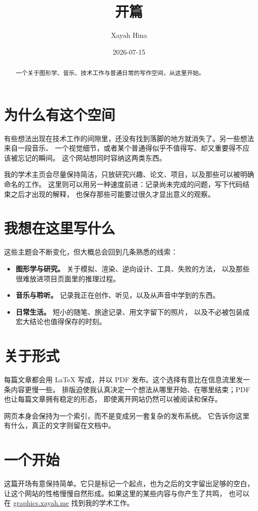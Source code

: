 \documentclass[11pt,a4paper,fontset=fandol,scheme=plain]{ctexart}
\title{开篇}
\author{Xayah Hina}
\date{2026-07-15}
\begin{document}
\maketitle

\begin{abstract}
一个关于图形学、音乐、技术工作与普通日常的写作空间，从这里开始。
\end{abstract}

\section{为什么有这个空间}

有些想法出现在技术工作的间隙里，还没有找到落脚的地方就消失了。另一些想法来自一段音乐、
一个视觉细节，或者某个普通得似乎不值得写、却又重要得不应该被忘记的瞬间。
这个网站想同时容纳这两类东西。

我的学术主页会尽量保持简洁，只放研究兴趣、论文、项目，以及那些可以被明确命名的工作。
这里则可以用另一种速度前进：记录尚未完成的问题，写下代码结束之后才出现的解释，
也保存那些可能要过很久才显出意义的观察。

\section{我想在这里写什么}

这些主题会不断变化，但大概总会回到几条熟悉的线索：

\begin{itemize}
  \item \textbf{图形学与研究。} 关于模拟、渲染、逆向设计、工具、失败的方法，
    以及那些很难放进项目页面里的推理过程。
  \item \textbf{音乐与聆听。} 记录我正在创作、听见，以及从声音中学到的东西。
  \item \textbf{日常生活。} 短小的随笔、旅途记录、用文字留下的照片，
    以及不必被包装成宏大结论也值得保存的时刻。
\end{itemize}

\section{关于形式}

每篇文章都会用 \LaTeX{} 写成，并以 PDF 发布。这个选择有意比在信息流里发一条内容更慢一些。
排版迫使我认真决定一个想法从哪里开始、在哪里结束；PDF 也让每篇文章拥有稳定的形态，
即使离开网站仍然可以被阅读和保存。

网页本身会保持为一个索引，而不是变成另一套复杂的发布系统。
它告诉你这里有什么，真正的文字则留在文档中。

\section{一个开始}

这篇开场有意保持简单。它只是标记一个起点，也为之后的文字留出足够的空白，
让这个网站的性格慢慢自然形成。如果这里的某些内容与你产生了共鸣，
也可以在 \href{https://graphics.xayah.me/}{graphics.xayah.me} 找到我的学术工作。
\end{document}
